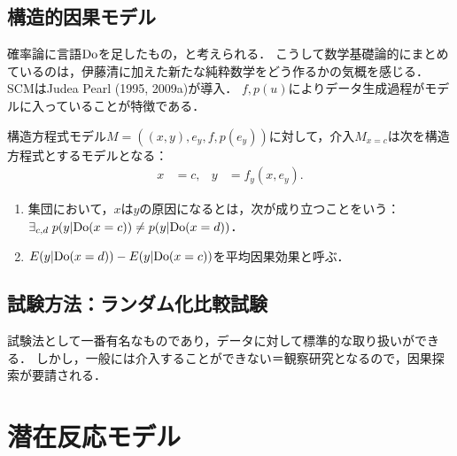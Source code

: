\documentclass[uplatex,dvipdfmx]{jsreport}
\begin{document}
\subsection{構造的因果モデル}

\begin{tcolorbox}[colframe=ForestGreen, colback=ForestGreen!10!white,breakable,colbacktitle=ForestGreen!40!white,coltitle=black,fonttitle=\bfseries\sffamily,
title=]
    確率論に言語$\mathrm{Do}$を足したもの，と考えられる．
    こうして数学基礎論的にまとめているのは，伊藤清に加えた新たな純粋数学をどう作るかの気概を感じる．
    SCMはJudea Pearl (1995, 2009a)が導入．
    $f,p(u)$によりデータ生成過程がモデルに入っていることが特徴である．
\end{tcolorbox}

\begin{definition}
    構造方程式モデル$M=((x,y),e_y,f,p(e_y))$に対して，介入$M_{x=c}$は次を構造方程式とするモデルとなる：
    \begin{align*}
        x&=c,&y&=f_y(x,e_y).
    \end{align*}
    \begin{enumerate}
        \item 集団において，$x$は$y$の原因になるとは，次が成り立つことをいう：$\exists_{c,d}\;p(y|\mathrm{Do}(x=c))\ne p(y|\mathrm{Do}(x=d))$．
        \item $E(y|\mathrm{Do}(x=d))-E(y|\mathrm{Do}(x=c))$を平均因果効果と呼ぶ．
    \end{enumerate}
\end{definition}

\subsection{試験方法：ランダム化比較試験}

\begin{tcolorbox}[colframe=ForestGreen, colback=ForestGreen!10!white,breakable,colbacktitle=ForestGreen!40!white,coltitle=black,fonttitle=\bfseries\sffamily,
title=]
    試験法として一番有名なものであり，データに対して標準的な取り扱いができる．
    しかし，一般には介入することができない＝観察研究となるので，因果探索が要請される．
\end{tcolorbox}

\section{潜在反応モデル}

\begin{definition}
    
\end{definition}
\end{document}
